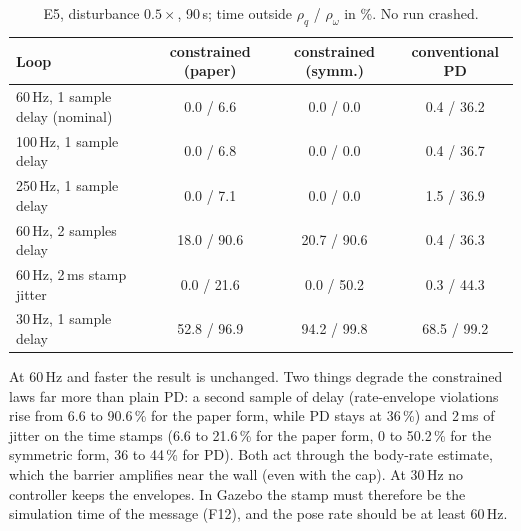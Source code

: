 \begin{table}[H]
\centering\small
\caption{E5, disturbance $0.5\times$, 90\,s; time outside $\rho_q$ / $\rho_\omega$ in \%. No run crashed.}
\label{tab:e5}
\begin{tabular}{@{}lccc@{}}
\toprule
\textbf{Loop} & \textbf{constrained (paper)} & \textbf{constrained (symm.)} & \textbf{conventional PD}\\
\midrule
60\,Hz, 1 sample delay (nominal) & 0.0 / 6.6 & 0.0 / 0.0 & 0.4 / 36.2\\
100\,Hz, 1 sample delay & 0.0 / 6.8 & 0.0 / 0.0 & 0.4 / 36.7\\
250\,Hz, 1 sample delay & 0.0 / 7.1 & 0.0 / 0.0 & 1.5 / 36.9\\
60\,Hz, 2 samples delay & 18.0 / 90.6 & 20.7 / 90.6 & 0.4 / 36.3\\
60\,Hz, 2\,ms stamp jitter & 0.0 / 21.6 & 0.0 / 50.2 & 0.3 / 44.3\\
30\,Hz, 1 sample delay & 52.8 / 96.9 & 94.2 / 99.8 & 68.5 / 99.2\\
\bottomrule
\end{tabular}
\end{table}

\begin{warn}
At 60\,Hz and faster the result is unchanged. Two things degrade the constrained laws far more than plain PD: a second
sample of delay (rate-envelope violations rise from 6.6 to 90.6\,\% for the paper form, while PD stays at 36\,\%) and
2\,ms of jitter on the time stamps (6.6 to 21.6\,\% for the paper form, 0 to 50.2\,\% for the symmetric form, 36 to 44\,\%
for PD). Both act through the body-rate estimate, which the barrier amplifies near the wall (even with the cap). At 30\,Hz no controller keeps the envelopes. In Gazebo the stamp must therefore be the simulation
time of the message (F12), and the pose rate should be at least 60\,Hz.
\end{warn}
